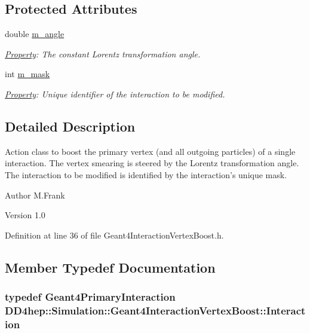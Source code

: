 \subsection*{Protected Attributes}
\begin{DoxyCompactItemize}
\item 
double \hyperlink{class_d_d4hep_1_1_simulation_1_1_geant4_interaction_vertex_boost_a545bdd5e80a80a03f613c7f9bd2e3c6c}{m\_\-angle}
\begin{DoxyCompactList}\small\item\em \hyperlink{class_d_d4hep_1_1_property}{Property}: The constant Lorentz transformation angle. \item\end{DoxyCompactList}\item 
int \hyperlink{class_d_d4hep_1_1_simulation_1_1_geant4_interaction_vertex_boost_a6627def92b1b92c93ad455853c65f3c3}{m\_\-mask}
\begin{DoxyCompactList}\small\item\em \hyperlink{class_d_d4hep_1_1_property}{Property}: Unique identifier of the interaction to be modified. \item\end{DoxyCompactList}\end{DoxyCompactItemize}


\subsection{Detailed Description}
Action class to boost the primary vertex (and all outgoing particles) of a single interaction. The vertex smearing is steered by the Lorentz transformation angle. The interaction to be modified is identified by the interaction's unique mask.

\begin{DoxyAuthor}{Author}
M.Frank 
\end{DoxyAuthor}
\begin{DoxyVersion}{Version}
1.0 
\end{DoxyVersion}


Definition at line 36 of file Geant4InteractionVertexBoost.h.

\subsection{Member Typedef Documentation}
\hypertarget{class_d_d4hep_1_1_simulation_1_1_geant4_interaction_vertex_boost_a24539ccb7908e132acaf99eeec5111e5}{
\subsubsection[{Interaction}]{\setlength{\rightskip}{0pt plus 5cm}typedef {\bf Geant4PrimaryInteraction} {\bf DD4hep::Simulation::Geant4InteractionVertexBoost::Interaction}}}
\label{class_d_d4hep_1_1_simulation_1_1_geant4_interaction_vertex_boost_a24539ccb7908e132acaf99eeec5111e5}


